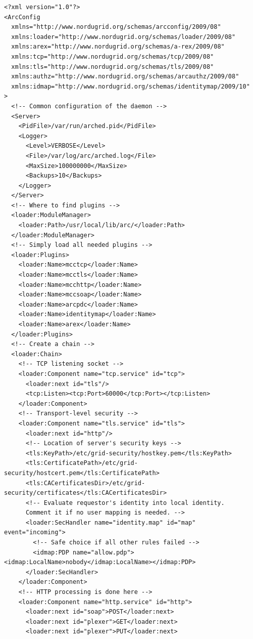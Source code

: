 \documentclass{article}                            %
\begin{document}
\begin{shaded}
\begin{verbatim}
<?xml version="1.0"?>
<ArcConfig
  xmlns="http://www.nordugrid.org/schemas/arcconfig/2009/08"
  xmlns:loader="http://www.nordugrid.org/schemas/loader/2009/08"
  xmlns:arex="http://www.nordugrid.org/schemas/a-rex/2009/08"
  xmlns:tcp="http://www.nordugrid.org/schemas/tcp/2009/08"
  xmlns:tls="http://www.nordugrid.org/schemas/tls/2009/08"
  xmlns:authz="http://www.nordugrid.org/schemas/arcauthz/2009/08"
  xmlns:idmap="http://www.nordugrid.org/schemas/identitymap/2009/10"
>
  <!-- Common configuration of the daemon -->
  <Server>
    <PidFile>/var/run/arched.pid</PidFile>
    <Logger>
      <Level>VERBOSE</Level>
      <File>/var/log/arc/arched.log</File>
      <MaxSize>100000000</MaxSize>
      <Backups>10</Backups>
    </Logger>
  </Server>
  <!-- Where to find plugins -->
  <loader:ModuleManager>
    <loader:Path>/usr/local/lib/arc/</loader:Path>
  </loader:ModuleManager>
  <!-- Simply load all needed plugins -->
  <loader:Plugins>
    <loader:Name>mcctcp</loader:Name>
    <loader:Name>mcctls</loader:Name>
    <loader:Name>mcchttp</loader:Name>
    <loader:Name>mccsoap</loader:Name>
    <loader:Name>arcpdc</loader:Name>
    <loader:Name>identitymap</loader:Name>
    <loader:Name>arex</loader:Name>
  </loader:Plugins>
  <!-- Create a chain -->
  <loader:Chain>
    <!-- TCP listening socket -->
    <loader:Component name="tcp.service" id="tcp">
      <loader:next id="tls"/>
      <tcp:Listen><tcp:Port>60000</tcp:Port></tcp:Listen>
    </loader:Component>
    <!-- Transport-level security -->
    <loader:Component name="tls.service" id="tls">
      <loader:next id="http"/>
      <!-- Location of server's security keys -->
      <tls:KeyPath>/etc/grid-security/hostkey.pem</tls:KeyPath>
      <tls:CertificatePath>/etc/grid-security/hostcert.pem</tls:CertificatePath>
      <tls:CACertificatesDir>/etc/grid-security/certificates</tls:CACertificatesDir>
      <!-- Evaluate requestor's identity into local identity.
      Comment it if no user mapping is needed. -->
      <loader:SecHandler name="identity.map" id="map" event="incoming">
        <!-- Safe choice if all other rules failed -->
        <idmap:PDP name="allow.pdp"><idmap:LocalName>nobody</idmap:LocalName></idmap:PDP>
      </loader:SecHandler>
    </loader:Component>
    <!-- HTTP processing is done here -->
    <loader:Component name="http.service" id="http">
      <loader:next id="soap">POST</loader:next>
      <loader:next id="plexer">GET</loader:next>
      <loader:next id="plexer">PUT</loader:next>

\end{verbatim}
\end{shaded}
\end{document}

